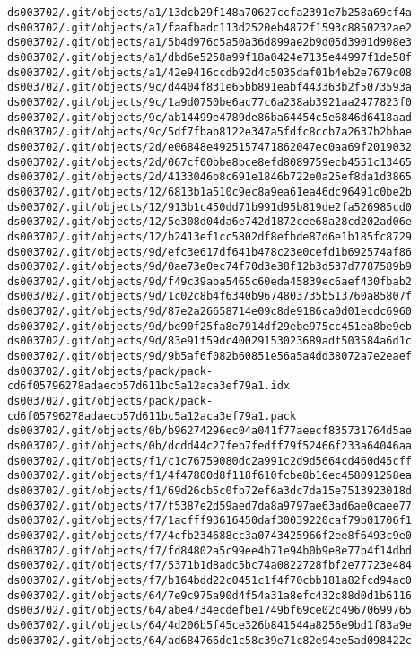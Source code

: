 \documentclass[11pt]{article}
\begin{document}
\begin{Verbatim}[commandchars=\\\{\}]
ds003702/.git/objects/a1/13dcb29f148a70627ccfa2391e7b258a69cf4a
ds003702/.git/objects/a1/faafbadc113d2520eb4872f1593c8850232ae2
ds003702/.git/objects/a1/5b4d976c5a50a36d899ae2b9d05d3901d908e3
ds003702/.git/objects/a1/dbd6e5258a99f18a0424e7135e44997f1de58f
ds003702/.git/objects/a1/42e9416ccdb92d4c5035daf01b4eb2e7679c08
ds003702/.git/objects/9c/d4404f831e65bb891eabf443363b2f5073593a
ds003702/.git/objects/9c/1a9d0750be6ac77c6a238ab3921aa2477823f0
ds003702/.git/objects/9c/ab14499e4789de86ba64454c5e6846d6418aad
ds003702/.git/objects/9c/5df7fbab8122e347a5fdfc8ccb7a2637b2bbae
ds003702/.git/objects/2d/e06848e4925157471862047ec0aa69f2019032
ds003702/.git/objects/2d/067cf00bbe8bce8efd8089759ecb4551c13465
ds003702/.git/objects/2d/4133046b8c691e1846b722e0a25ef8da1d3865
ds003702/.git/objects/12/6813b1a510c9ec8a9ea61ea46dc96491c0be2b
ds003702/.git/objects/12/913b1c450dd71b991d95b819de2fa526985cd0
ds003702/.git/objects/12/5e308d04da6e742d1872cee68a28cd202ad06e
ds003702/.git/objects/12/b2413ef1cc5802df8efbde87d6e1b185fc8729
ds003702/.git/objects/9d/efc3e617df641b478c23e0cefd1b692574af86
ds003702/.git/objects/9d/0ae73e0ec74f70d3e38f12b3d537d7787589b9
ds003702/.git/objects/9d/f49c39aba5465c60eda45839ec6aef430fbab2
ds003702/.git/objects/9d/1c02c8b4f6340b9674803735b513760a85807f
ds003702/.git/objects/9d/87e2a26658714e09c8de9186ca0d01ecdc6960
ds003702/.git/objects/9d/be90f25fa8e7914df29ebe975cc451ea8be9eb
ds003702/.git/objects/9d/83e91f59dc40029153023689adf503584a6d1c
ds003702/.git/objects/9d/9b5af6f082b60851e56a5a4dd38072a7e2eaef
ds003702/.git/objects/pack/pack-
cd6f05796278adaecb57d611bc5a12aca3ef79a1.idx
ds003702/.git/objects/pack/pack-
cd6f05796278adaecb57d611bc5a12aca3ef79a1.pack
ds003702/.git/objects/0b/b96274296ec04a041f77aeecf835731764d5ae
ds003702/.git/objects/0b/dcdd44c27feb7fedff79f52466f233a64046aa
ds003702/.git/objects/f1/c1c76759080dc2a991c2d9d5664cd460d45cff
ds003702/.git/objects/f1/4f47800d8f118f610fcbe8b16ec458091258ea
ds003702/.git/objects/f1/69d26cb5c0fb72ef6a3dc7da15e7513923018d
ds003702/.git/objects/f7/f5387e2d59aed7da8a9797ae63ad6ae0caee77
ds003702/.git/objects/f7/1acfff93616450daf30039220caf79b01706f1
ds003702/.git/objects/f7/4cfb234688cc3a0743425966f2ee8f6493c9e0
ds003702/.git/objects/f7/fd84802a5c99ee4b71e94b0b9e8e77b4f14dbd
ds003702/.git/objects/f7/5371b1d8adc5bc74a0822728fbf2e77723e484
ds003702/.git/objects/f7/b164bdd22c0451c1f4f70cbb181a82fcd94ac0
ds003702/.git/objects/64/7e9c975a90d4f54a31a8efc432c88d0d1b6116
ds003702/.git/objects/64/abe4734ecdefbe1749bf69ce02c49670699765
ds003702/.git/objects/64/4d206b5f45ce326b841544a8256e9bd1f83a9e
ds003702/.git/objects/64/ad684766de1c58c39e71c82e94ee5ad098422c

\end{Verbatim}
\end{document}
